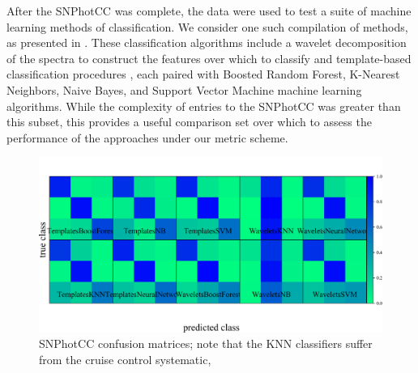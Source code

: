 After the SNPhotCC was complete, the data were used to test a suite of machine learning methods of classification. We consider one such compilation of methods, as presented in \cite{lochner_photometric_2016}. These classification algorithms include a wavelet decomposition of the spectra to construct the features over which to classify \citep{2011MNRAS.414.1987N} and template-based classification procedures \citep{2011ApJ...738..162S}, each paired with Boosted Random Forest, K-Nearest Neighbors, Naive Bayes, and Support Vector Machine machine learning algorithms. While the complexity of entries to the SNPhotCC was greater than this subset, this provides a useful comparison set over which to assess the performance of the approaches under our metric scheme.
\begin{figure}
	\begin{center}
    \includegraphics[width=\textwidth]{./fig/all_snphotcc_cm.png}
		\caption{SNPhotCC confusion matrices; note that the KNN classifiers suffer from the cruise control systematic, }
		\label{fig:snphotcc_cm}
	\end{center}
\end{figure}



%
